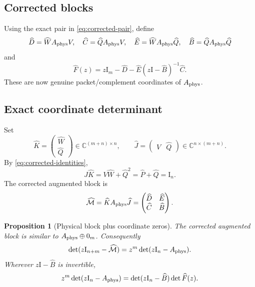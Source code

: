 \documentclass[11pt]{article}
\newtheorem{proposition}[theorem]{Proposition}
\theoremstyle{definition}
\theoremstyle{remark}
\newcommand{\C}{\mathbb C}
\newcommand{\Id}{\mathrm I}
\newcommand{\Aphys}{A_{\rm phys}}
\newcommand{\Mcorrected}{\widehat{\mathcal M}}
\begin{document}
\subsection{Corrected blocks}

Using the exact pair in \cref{eq:corrected-pair}, define
\begin{equation}
 \widehat D=\widehat W\Aphys V,\quad
 \widehat C=\widehat Q\Aphys V,\quad
 \widehat E=\widehat W\Aphys\widehat Q,\quad
 \widehat B=\widehat Q\Aphys\widehat Q
 \label{eq:corrected-blocks}
\end{equation}
and
\begin{equation}
 \widehat F(z)
 =z\Id_m-\widehat D
 -\widehat E(z\Id-\widehat B)^{-1}\widehat C.
 \label{eq:corrected-f}
\end{equation}
These are now genuine packet/complement coordinates of \(\Aphys\).

\subsection{Exact coordinate determinant}

Set
\begin{equation}
 \widehat K=
 \begin{pmatrix}\widehat W\\ \widehat Q\end{pmatrix}
 \in\C^{(m+n)\times n},
 \qquad
 \widehat J=
 \begin{pmatrix}V&\widehat Q\end{pmatrix}
 \in\C^{n\times(m+n)}.
 \label{eq:coordinate-factors}
\end{equation}
By \cref{eq:corrected-identities},
\begin{equation}
 \widehat J\widehat K
 =V\widehat W+\widehat Q^2
 =\widehat P+\widehat Q
 =\Id_n.
 \label{eq:left-inverse}
\end{equation}
The corrected augmented block is
\begin{equation}
 \Mcorrected
 =\widehat K\Aphys\widehat J
 =
 \begin{pmatrix}
  \widehat D&\widehat E\\
  \widehat C&\widehat B
 \end{pmatrix}.
 \label{eq:corrected-augmented}
\end{equation}

\begin{proposition}[Physical block plus coordinate zeros]
\label{prop:physical-plus-zero}
The corrected augmented block is similar to
\(\Aphys\oplus0_m\).  Consequently
\begin{equation}
 \det(z\Id_{n+m}-\Mcorrected)
 =z^m\det(z\Id_n-\Aphys).
 \label{eq:physical-determinant}
\end{equation}
Wherever \(z\Id-\widehat B\) is invertible,
\begin{equation}
 z^m\det(z\Id_n-\Aphys)
 =\det(z\Id_n-\widehat B)\det\widehat F(z).
 \label{eq:corrected-schur-identity}
\end{equation}
\end{proposition}
\end{document}
